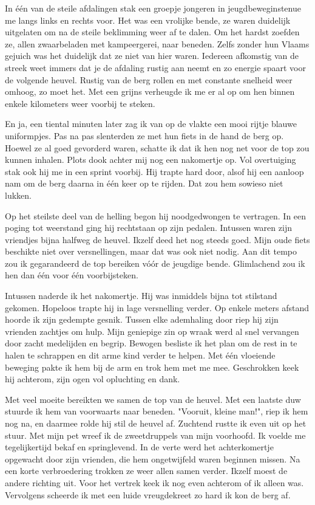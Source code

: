 \documentclass[12pt, justified, a4paper, symmetric]{tufte-book}
\begin{document}
In \'e\'en van de steile afdalingen stak een groepje jongeren in jeugdbeweginstenue me langs links en rechts voor. Het was een vrolijke bende, ze waren duidelijk uitgelaten om na de steile beklimming weer af te dalen. Om het hardst zoefden ze, allen zwaarbeladen met kampeergerei, naar beneden. Zelfs zonder hun Vlaams gejuich was het duidelijk dat ze niet van hier waren. Iedereen afkomstig van de streek weet immers dat je de afdaling rustig aan neemt en zo energie spaart voor de volgende heuvel. Rustig van de berg rollen en met constante snelheid weer omhoog, zo moet het. Met een grijns verheugde ik me er al op om hen binnen enkele kilometers weer voorbij te steken.

En ja, een tiental minuten later zag ik van op de vlakte een mooi rijtje blauwe uniformpjes. Pas na pas slenterden ze met hun fiets in de hand de berg op. Hoewel ze al goed gevorderd waren, schatte ik dat ik hen nog net voor de top zou kunnen inhalen. Plots dook achter mij nog een nakomertje op. Vol overtuiging stak ook hij me in een sprint voorbij. Hij trapte hard door, alsof hij een aanloop nam om de berg daarna in \'e\'en keer op te rijden. Dat zou hem sowieso niet lukken.

Op het steilste deel van de helling begon hij noodgedwongen te vertragen. In een poging tot weerstand ging hij rechtstaan op zijn pedalen. Intussen waren zijn vriendjes bijna halfweg de heuvel. Ikzelf deed het nog steeds goed. Mijn oude fiets beschikte niet over versnellingen, maar dat was ook niet nodig. Aan dit tempo zou ik gegarandeerd de top bereiken v\'o\'or de jeugdige bende. Glimlachend zou ik hen dan \'e\'en voor \'e\'en voorbijsteken.

Intussen naderde ik het nakomertje. Hij was inmiddels bijna tot stilstand gekomen. Hopeloos trapte hij in lage versnelling verder. Op enkele meters afstand hoorde ik zijn gedempte gesnik. Tussen elke ademhaling door riep hij zijn vrienden zachtjes om hulp. Mijn geniepige zin op wraak werd al snel vervangen door zacht medelijden en begrip. Bewogen besliste ik het plan om de rest in te halen te schrappen en dit arme kind verder te helpen. Met \'e\'en vloeiende beweging pakte ik hem bij de arm en trok hem met me mee. Geschrokken keek hij achterom, zijn ogen vol opluchting en dank.

Met veel moeite bereikten we samen de top van de heuvel. Met een laatste duw stuurde ik hem van voorwaarts naar beneden. "Vooruit, kleine man!", riep ik hem nog na, en daarmee rolde hij stil de heuvel af. Zuchtend rustte ik even uit op het stuur. Met mijn pet wreef ik de zweetdruppels van mijn voorhoofd. Ik voelde me tegelijkertijd bekaf en springlevend. In de verte werd het achterkomertje opgewacht door zijn vrienden, die hem ongetwijfeld waren beginnen missen. Na een korte verbroedering trokken ze weer allen samen verder. Ikzelf moest de andere richting uit. Voor het vertrek keek ik nog even achterom of ik alleen was. Vervolgens scheerde ik met een luide vreugdekreet zo hard ik kon de berg af.
\end{document}
